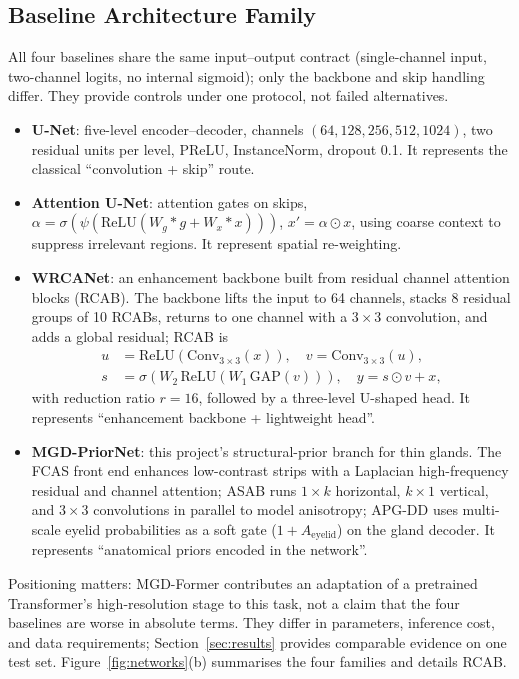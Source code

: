 \subsection{Baseline Architecture Family}\label{sec:baselines}

All four baselines share the same input--output contract (single-channel input, two-channel logits, no internal sigmoid); only the backbone and skip handling differ. They provide controls under one protocol, not failed alternatives.

\begin{itemize}
\item \textbf{U-Net}\cite{ronneberger2015unet}: five-level encoder--decoder, channels $(64,128,256,512,1024)$, two residual units per level, PReLU, InstanceNorm, dropout 0.1. It represents the classical ``convolution + skip'' route.
\item \textbf{Attention U-Net}\cite{oktay2018attention}: attention gates on skips,
$\alpha=\sigma(\psi(\mathrm{ReLU}(W_g*g+W_x*x)))$, $x'=\alpha\odot x$, using coarse context to suppress irrelevant regions. It represent spatial re-weighting.
\item \textbf{WRCANet}: an enhancement backbone built from residual channel attention blocks (RCAB)\cite{zhang2018rcan}. The backbone lifts the input to 64 channels, stacks 8 residual groups of 10 RCABs, returns to one channel with a $3\times3$ convolution, and adds a global residual; RCAB is
\begin{align}
u &= \mathrm{ReLU}(\mathrm{Conv}_{3\times3}(x)),\quad v=\mathrm{Conv}_{3\times3}(u),\\
s &= \sigma\!\left(W_2\,\mathrm{ReLU}\!\left(W_1\,\mathrm{GAP}(v)\right)\right),\quad y=s\odot v+x,
\end{align}
with reduction ratio $r=16$, followed by a three-level U-shaped head. It represents ``enhancement backbone + lightweight head''.
\item \textbf{MGD-PriorNet}: this project's structural-prior branch for thin glands. The FCAS front end enhances low-contrast strips with a Laplacian high-frequency residual and channel attention; ASAB runs $1\times k$ horizontal, $k\times1$ vertical, and $3\times3$ convolutions in parallel to model anisotropy; APG-DD uses multi-scale eyelid probabilities as a soft gate ($1+A_{\mathrm{eyelid}}$) on the gland decoder. It represents ``anatomical priors encoded in the network''.
\end{itemize}

Positioning matters: MGD-Former contributes an adaptation of a pretrained Transformer's high-resolution stage to this task, not a claim that the four baselines are worse in absolute terms. They differ in parameters, inference cost, and data requirements; Section~\ref{sec:results} provides comparable evidence on one test set. Figure~\ref{fig:networks}(b) summarises the four families and details RCAB.

